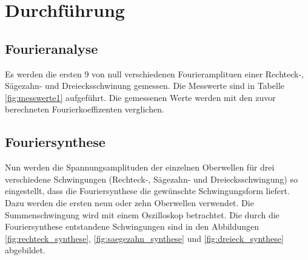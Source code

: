 \section{Durchführung}
\label{sec:Durchführung}
\subsection{Fourieranalyse}
Es werden die ersten 9 von null verschiedenen Fourieramplituen einer Rechteck-,
Sägezahn- und Dreiecksschwinung gemessen. Die Messwerte sind in Tabelle
\ref{fig:messwerte1} aufgeführt. Die gemessenen Werte werden mit den zuvor
berechneten Fourierkoeffizenten verglichen.


\subsection{Fouriersynthese}
Nun werden die Spannungsamplituden der einzelnen Oberwellen für drei verschiedene
Schwingungen (Rechteck-, Sägezahn- und Dreiecksschwingung) so eingestellt, dass
die Fouriersynthese die gewünschte Schwingungsform liefert. Dazu werden die ersten
neun oder zehn Oberwellen verwendet.
Die Summenschwingung wird mit einem Oszilloskop betrachtet. Die durch die
Fouriersynthese entstandene Schwingungen sind in den Abbildungen
\ref{fig:rechteck_synthese}, \ref{fig:saegezahn_synthese} und \ref{fig:dreieck_synthese}
abgebildet.
